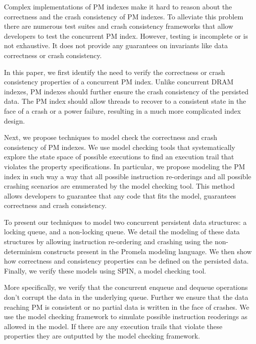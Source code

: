 Complex implementations of PM indexes make it hard to reason about the
correctness and the crash consistency of PM indexes. To alleviate this problem
there are numerous test suites and crash consistency frameworks that allow
developers to test the concurrent PM index. However, testing is incomplete or
is not exhaustive. It does not provide any guarantees on invariants like
data correctness or crash consistency.

In this paper, we first
identify the need to verify the correctness or crash consistency properties
of a concurrent PM index. Unlike concurrent DRAM indexes, PM indexes should
further ensure the crash consistency of the persisted data. The PM index
should allow threads to recover to a consistent state in the face of a crash or
a power failure, resulting in a much more complicated index design.

Next,
we propose techniques to model check the correctness and crash consistency of
PM indexes. We use model checking tools that systematically explore the state
space of possible executions to find an execution trail that violates the
property specifications. In particular, we propose modeling the PM index in
such way a way that all possible instruction re-orderings and all possible
crashing scenarios are enumerated by the model checking tool. This method
allows developers to guarantee that any code that fits the model, guarantees
correctness and crash consistency.

To present our techniques to model two concurrent persistent data structures:
a locking queue, and a non-locking queue. We detail the modeling of these data
structures by allowing instruction re-ordering and crashing using the
non-determinism constructs present in the Promela modeling language. We then
show how correctness and consistency properties can be defined on the persisted
data. Finally, we verify these models using SPIN, a model checking tool.

More specifically, we verify that the concurrent enqueue and dequeue operations
don't corrupt the data in the underlying queue. Further we ensure that the data
reaching PM is consistent or no partial data is written in the face of crashes.
We use the model checking framework to simulate possible instruction reoderings
as allowed in the model. If there are any execution trails that violate these
properties they are outputted by the model checking framework.

